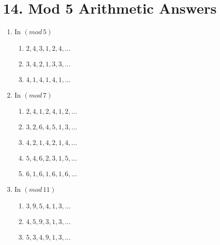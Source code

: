 \documentclass[11pt]{article}
\begin{document}
\section*{14. Mod 5 Arithmetic Answers}
\begin{enumerate}
	\item In $(mod \, 5)$
	\begin{enumerate}
		\item $2, 4, 3, 1, 2, 4, \ldots$
		\item $3, 4, 2, 1, 3, 3, \ldots$
		\item $4, 1, 4, 1, 4, 1, \ldots$
	\end{enumerate}
	\item In $(mod \, 7)$
	\begin{enumerate}
		\item $2, 4, 1, 2, 4, 1, 2, \ldots$
		\item $3, 2, 6, 4, 5, 1, 3, \ldots$
		\item $4, 2, 1, 4, 2, 1, 4, \ldots$
		\item $5, 4, 6, 2, 3, 1, 5, \ldots$
		\item $6, 1, 6, 1, 6, 1, 6, \ldots$
	\end{enumerate}
	\item In $(mod \, 11 )$
	\begin{enumerate}
		\item $3, 9, 5, 4, 1, 3,\ldots$
		\item $4, 5, 9, 3, 1, 3, \ldots$
		\item $5, 3, 4, 9, 1, 3, \ldots$
	\end{enumerate}
\end{enumerate}
\end{document}
